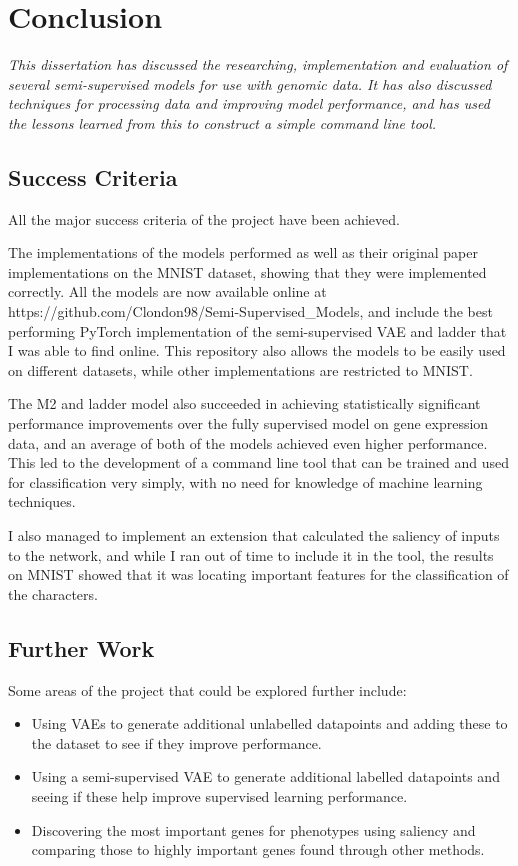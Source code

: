\chapter{Conclusion}

\textit{This dissertation has discussed the researching, implementation and evaluation of several semi-supervised models for use with genomic
data. It has also discussed techniques for processing data and improving model performance, and has used the lessons learned from 
this to construct a simple command line tool.}

\section{Success Criteria}

All the major success criteria of the project have been achieved. 

The implementations of the models performed as well as their original paper implementations on the MNIST dataset, showing that they were 
implemented correctly. All the models are now available online at https://github.com/Clondon98/Semi-Supervised\_Models, and include the 
best performing PyTorch implementation of the semi-supervised VAE and ladder that I was able to find online. This repository also allows 
the models to be easily used on different datasets, while other implementations are restricted to MNIST. 

The M2 and ladder model also succeeded in achieving statistically significant performance improvements over the fully supervised model on 
gene expression data, and an average of both of the models achieved even higher performance. This led to the development of a 
command line tool that can be trained and used for classification very simply, with no need for knowledge of machine learning techniques.

I also managed to implement an extension that calculated the saliency of inputs to the network, and while I ran out of time to include it 
in the tool, the results on MNIST showed that it was locating important features for the classification of the characters.

\section{Further Work}

Some areas of the project that could be explored further include:
\begin{itemize}
    \item Using VAEs to generate additional unlabelled datapoints and adding these to the dataset to see if they improve performance.
    \item Using a semi-supervised VAE to generate additional labelled datapoints and seeing if these help improve supervised learning 
          performance.
    \item Discovering the most important genes for phenotypes using saliency and comparing those to highly important genes found through
          other methods.  
\end{itemize}

